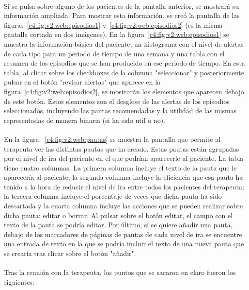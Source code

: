 \paragraph{}
Si se pulsa sobre alguno de los pacientes de la pantalla anterior, se mostrará su información ampliada. Para mostrar esta información, se creó la pantalla de las figuras~\ref{c4:fig:v2:web:episodios1} y~\ref{c4:fig:v2:web:episodios2} (es la misma pantalla cortada en dos imágenes). En la figura~\ref{c4:fig:v2:web:episodios1} se muestra la información básica del paciente, un histograma con el nivel de alertas de cada tipo para un periodo de tiempo de una semana y una tabla con el resumen de los episodios que se han producido en ese periodo de tiempo. En esta tabla, al clicar sobre los checkboxes de la columna "seleccionar" y posteriormente pulsar en el botón "revisar alertas" que aparece en la figura~\ref{c4:fig:v2:web:episodios2}, se mostrarán los elementos que aparecen debajo de este botón. Estos elementos son el desglose de las alertas de los episodios seleccionados, incluyendo las pautas recomendadas y la utilidad de las mismas representadas de manera binaria (si ha sido util o no).

\paragraph{}
En la figura ~\ref{c4:fig:v2:web:pautas} se muestra la pantalla que permite al terapeuta ver las distintas pautas que ha creado. Estas pautas están agrupadas por el nivel de ira del paciente en el que podrían aparecerle al paciente. La tabla tiene cuatro columnas. La primera columna incluye el texto de la pauta que le aparecería al paciente; la segunda columna incluye la eficiencia que esa pauta ha tenido a la hora de reducir el nivel de ira entre todos los pacientes del terapeuta; la tercera columna incluye el porcentaje de veces que dicha pauta ha sido descartada y la cuarta columna incluye las acciones que se pueden realizar sobre dicha pauta: editar o borrar. Al pulsar sobre el botón editar, el campo con el texto de la pauta se podría editar. Por último, si se quiere añadir una pauta, debajo de los marcadores de páginas de pautas de cada nivel de ira se encuentre una entrada de texto en la que se podría incluir el texto de una nueva pauta que se crearía tras clicar sobre el botón "añadir".

\paragraph{}
Tras la reunión con la terapeuta, los puntos que se sacaron en claro fueron los siguientes:

